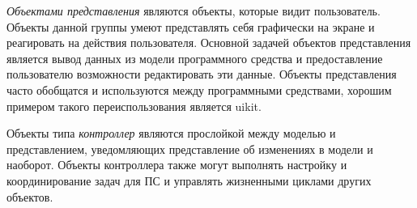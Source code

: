 \emph{Объектами представления} являются объекты, которые видит пользователь. Объекты данной группы умеют представлять себя графически на экране и реагировать на действия пользователя. Основной задачей объектов представления является вывод данных из модели программного средства и предоставление пользователю возможности редактировать эти данные. Объекты представления часто обобщатся и используются между программными средствами, хорошим примером такого переиспользования является \gls{uikit}. 

Объекты типа \emph{контроллер} являются прослойкой между моделью и представлением, уведомляющих представление об изменениях в модели и наоборот. Объекты контроллера также могут выполнять настройку и координирование задач для ПС и управлять жизненными циклами других объектов. 